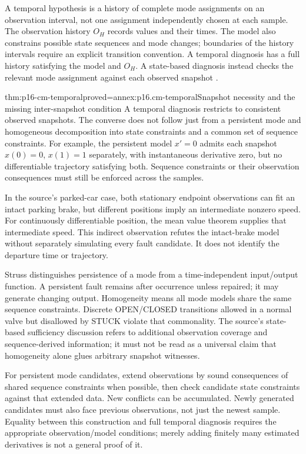 A temporal hypothesis is a history of complete mode assignments on an
observation interval, not one assignment independently chosen at each sample.
The observation history \(O_H\) records values and their times. The model
also constrains possible state sequences and mode changes; boundaries of
the history intervals require an explicit transition convention. A temporal
diagnosis has a full history satisfying the model and \(O_H\).
A state-based diagnosis instead checks the relevant mode assignment against
each observed snapshot \cite[pp.~423--427]{Struss2008ModelBasedProblemSolving}.

\begin{hbtheorem}{thm:p16-cm-temporal}{proved=annex:p16.cm-temporal}{Snapshot necessity and the missing inter-snapshot condition}
A temporal diagnosis restricts to consistent observed snapshots. The converse
does not follow just from a persistent mode and homogeneous decomposition
into state constraints and a common set of sequence constraints. For example,
the persistent model \(x'=0\) admits each snapshot \(x(0)=0\),
\(x(1)=1\) separately, with instantaneous derivative zero, but no
differentiable trajectory satisfying both. Sequence constraints or their
observation consequences must still be enforced across the samples.
\end{hbtheorem}

In the source's parked-car case, both stationary endpoint observations can
fit an intact parking brake, but different positions imply an intermediate
nonzero speed. For continuously differentiable position, the mean value
theorem supplies that intermediate speed. This indirect observation refutes
the intact-brake model without separately simulating every fault candidate.
It does not identify the departure time or trajectory.

Struss distinguishes persistence of a mode from a time-independent input/output
function. A persistent fault remains after occurrence unless repaired; it
may generate changing output. Homogeneity means all mode models share the
same sequence constraints. Discrete OPEN/CLOSED transitions allowed in a
normal valve but disallowed by STUCK violate that commonality. The source's
state-based sufficiency discussion refers to additional observation coverage
and sequence-derived information; it must not be read as a universal claim
that homogeneity alone glues arbitrary snapshot witnesses.

For persistent mode candidates, extend observations by sound consequences
of shared sequence constraints when possible, then check candidate state
constraints against that extended data. New conflicts can be accumulated.
Newly generated candidates must also face previous observations, not just
the newest sample. Equality between this construction and full temporal
diagnosis requires the appropriate observation/model conditions; merely
adding finitely many estimated derivatives is not a general proof of it.

